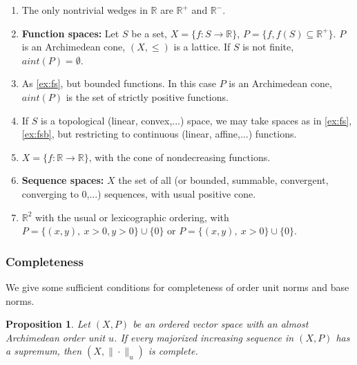 \documentclass[12pt]{article}
\newtheorem{prop}{Proposition}
\theoremstyle{remark}
\newcommand{\<}{\langle}
\begin{document}
\begin{enumerate}
\item The only nontrivial wedges in $\mathbb R$ are $\mathbb R^+$ and $\mathbb R^{-}$.
\item \label{ex:fs}\textbf{Function spaces:} Let $S$ be a set, $X=\{f:S\to \mathbb R\}$, $P=\{f, f(S)\subseteq \mathbb R^+\}$. $P$ is an Archimedean cone, $(X,\le)$ is a lattice. If $S$ is not finite, $aint(P)=\emptyset$.
\item  \label{ex:fsb} As \ref{ex:fs}, but bounded functions.  In this case $P$ is an Archimedean cone, $aint(P)$ is the set of strictly positive functions.
\item If $S$ is a topological (linear, convex,...) space, we may take spaces as in \ref{ex:fs}, \ref{ex:fsb}, but restricting to  continuous (linear, affine,...) functions.\item $X=\{f:\mathbb R\to \mathbb R\} $, with the cone of nondecreasing functions.
\item \textbf{Sequence spaces:} $X$ the set of all  (or bounded, summable, convergent, converging to 0,...) sequences, with usual positive cone.
\item $\mathbb R^2$ with the usual or lexicographic ordering, with $P=\{(x,y),\ x>0, y>0\}\cup \{0\}$ or $P=\{(x,y),\ x>0\}\cup \{0\}$.
\end{enumerate}



\subsubsection*{Completeness}

We give some sufficient conditions for completeness of order unit norms and base norms.

\begin{prop}\cite{jameson} Let $(X,P)$ be an ordered vector space with an almost Archimedean order unit $u$. If every majorized increasing sequence in $(X,P)$ has a supremum, then $(X,\|\cdot\|_u)$ is complete.


\end{prop}
\end{document}
